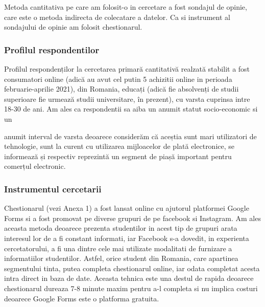 \documentclass[a4paper, 12pt]{article}
\begin{document}
	\quad Metoda cantitativa pe care am folosit-o in cercetare a fost sondajul de opinie, care este o metoda indirecta de colecatare a datelor. Ca si instrument al sondajului de opinie am folosit chestionarul.
	\subsubsection{Profilul respondentilor}
	\qquad Profilul respondenților la cercetarea primară cantitativă realzată stabilit a fost consumatori online (adică au avut cel putin 5 achizitii online in perioada februarie-aprilie 2021), din Romania, educați (adică fie absolvenți de studii superioare fie urmează studii universitare, în prezent), cu varsta cuprinsa intre 18-30 de ani. Am ales ca respondentii sa aiba un anumit statut socio-economic si un
	
	anumit interval de varsta deoarece considerăm că aceștia sunt mari utilizatori de tehnologie, sunt la curent cu utilizarea mijloacelor de plată electronice, se informează și respectiv reprezintă un segment de piașă important pentru comerțul electronic.
	\subsubsection{Instrumentul cercetarii}
		\qquad  Chestionarul (vezi Anexa 1) a fost lansat online cu ajutorul platformei Google Forms si a fost promovat  pe diverse grupuri de pe facebook si Instagram. Am ales aceasta metoda deoarece prezenta studentilor in acest tip de grupuri arata interesul lor de a fi constant informati, iar Facebook s-a dovedit, in experienta cercetatorului, a fi una dintre cele mai utilizate modalitati de furnizare a informatiilor studentilor. Astfel, orice student din Romania, care apartinea segmentului tinta, putea completa chestionarul online, iar odata completat acesta intra direct in baza de date. Aceasta tehnica este una destul de rapida deoarece chestionarul dureaza 7-8 minute maxim pentru a-l completa si nu implica costuri deoarece Google Forms este o platforma gratuita.
\end{document}
